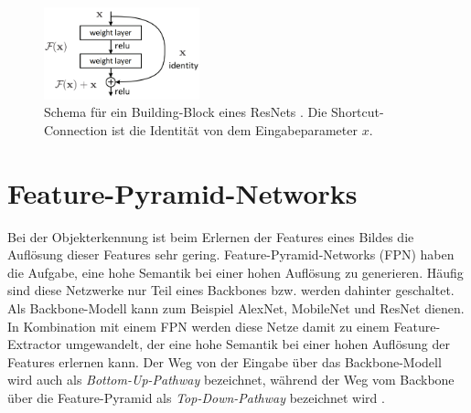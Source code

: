 \begin{figure}
    \centering
    \includegraphics[width=0.4\textwidth]{images/resnet_building_block.png}
    \caption{Schema für ein Building-Block eines ResNets \cite{he2015deep}. Die
    Shortcut-Connection ist die Identität von dem Eingabeparameter $x$.}
    \label{fig:resnet-building-block}
\end{figure}

\section{Feature-Pyramid-Networks}
Bei der Objekterkennung ist beim Erlernen der Features eines Bildes die
Auflösung dieser Features sehr gering. Feature-Pyramid-Networks (FPN) haben die
Aufgabe, eine hohe Semantik bei einer hohen Auflösung zu generieren. Häufig sind
diese Netzwerke nur Teil eines Backbones bzw. werden dahinter geschaltet. Als
Backbone-Modell kann zum Beispiel AlexNet, MobileNet und ResNet dienen. In
Kombination mit einem FPN werden diese Netze damit zu einem Feature-Extractor
umgewandelt, der eine hohe Semantik bei einer hohen Auflösung der Features
erlernen kann. Der Weg von der Eingabe über das Backbone-Modell wird auch als
\textit{Bottom-Up-Pathway} bezeichnet, während der Weg vom Backbone über die
Feature-Pyramid als \textit{Top-Down-Pathway} bezeichnet wird
\cite{lin2017feature}.

